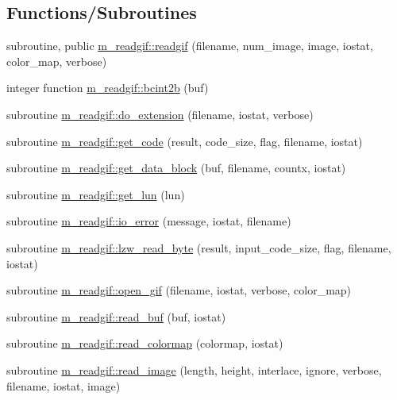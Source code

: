 \subsection*{Functions/\+Subroutines}
\begin{DoxyCompactItemize}
\item 
subroutine, public \mbox{\hyperlink{namespacem__readgif_a775e2da2a9f54ec308e87a339a393ed6}{m\+\_\+readgif\+::readgif}} (filename, num\+\_\+image, image, iostat, color\+\_\+map, verbose)
\item 
integer function \mbox{\hyperlink{namespacem__readgif_a38594ce718f97f844771250edcd5e496}{m\+\_\+readgif\+::bcint2b}} (buf)
\item 
subroutine \mbox{\hyperlink{namespacem__readgif_a93c5f69ee5054ba2c10ed17b8ab53f6b}{m\+\_\+readgif\+::do\+\_\+extension}} (filename, iostat, verbose)
\item 
subroutine \mbox{\hyperlink{namespacem__readgif_a027fedbf7ba68763483988c1aa6d2cea}{m\+\_\+readgif\+::get\+\_\+code}} (result, code\+\_\+size, flag, filename, iostat)
\item 
subroutine \mbox{\hyperlink{namespacem__readgif_ace6e51d0293107696bd1482348414a43}{m\+\_\+readgif\+::get\+\_\+data\+\_\+block}} (buf, filename, countx, iostat)
\item 
subroutine \mbox{\hyperlink{namespacem__readgif_a7109d632cddcb8d66729d25bbed5c33c}{m\+\_\+readgif\+::get\+\_\+lun}} (lun)
\item 
subroutine \mbox{\hyperlink{namespacem__readgif_ae01d3edbe9e15bf4dd33070581e26fee}{m\+\_\+readgif\+::io\+\_\+error}} (message, iostat, filename)
\item 
subroutine \mbox{\hyperlink{namespacem__readgif_a314e657d0662360266bac5702a657ef1}{m\+\_\+readgif\+::lzw\+\_\+read\+\_\+byte}} (result, input\+\_\+code\+\_\+size, flag, filename, iostat)
\item 
subroutine \mbox{\hyperlink{namespacem__readgif_ae008e851af60f4d8fdeeb4fd96b8580d}{m\+\_\+readgif\+::open\+\_\+gif}} (filename, iostat, verbose, color\+\_\+map)
\item 
subroutine \mbox{\hyperlink{namespacem__readgif_a272a4dbcc1419d3d103db4c50b757805}{m\+\_\+readgif\+::read\+\_\+buf}} (buf, iostat)
\item 
subroutine \mbox{\hyperlink{namespacem__readgif_aabaf13dcb1e665b2524049e5661ca4b6}{m\+\_\+readgif\+::read\+\_\+colormap}} (colormap, iostat)
\item 
subroutine \mbox{\hyperlink{namespacem__readgif_a4af978d944dbefb3ddeb81cd8c54d0f9}{m\+\_\+readgif\+::read\+\_\+image}} (length, height, interlace, ignore, verbose, filename, iostat, image)
\end{DoxyCompactItemize}
